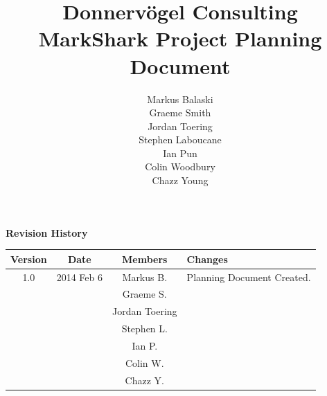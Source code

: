 \documentclass{article}
\begin{document}
\title{Donnervögel Consulting \\ MarkShark Project Planning Document}
\author{Markus Balaski \\ Graeme Smith \\ Jordan Toering \\ Stephen Laboucane \\ Ian Pun \\ Colin Woodbury \\ Chazz Young}
\maketitle
\clearpage

\textbf{Revision History}
\begin{center}
  \begin{tabular}{| c | c | c | l |}
    \hline
    Version & Date & Members & Changes\\
    \hline
    1.0 & 2014 Feb 6 & Markus B. & Planning Document Created.\\
    & & Graeme S. & \\
    & & Jordan Toering & \\
    & & Stephen L. & \\
    & & Ian P. & \\
    & & Colin W. & \\
    & & Chazz Y. & \\
    \hline
  \end{tabular}
\end{center}
\clearpage

\tableofcontents
\clearpage

\end{document}
